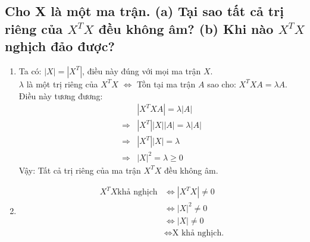 \documentclass{article}
\begin{document}
\subsection{Cho X là một ma trận. (a) Tại sao tất cả trị riêng của $X^TX$ đều không âm? (b) Khi nào $X^TX$ nghịch đảo được?}
\begin{enumerate}[label=(\alph*)]
\item Ta có: $|X| = |X^T|$, điều này đúng với mọi ma trận $X$.\\
$\lambda$ là một trị riêng của $X^TX$ $\Leftrightarrow$ Tồn tại ma trận $A$ sao cho: $X^TXA = \lambda A$.\\
Điều này tương đương:\\
\begin{align*}
    & |X^TXA| = \lambda |A|\\
    \Rightarrow & |X^T||X||A| = \lambda |A| \\
    \Rightarrow &  |X^T||X|= \lambda\\
    \Rightarrow &  |X|^2= \lambda \geq 0
\end{align*}
Vậy: Tất cả trị riêng của ma trận $X^TX$ đều không âm. 

\item 
\begin{align*}
    X^TX \text{khả nghịch} & \Leftrightarrow |X^TX| \neq 0\\
    & \Leftrightarrow |X|^2 \neq 0\\
    & \Leftrightarrow |X| \neq 0\\
    & \Leftrightarrow \text{X khả nghịch.}
\end{align*}
   

\end{enumerate}
\end{document}
